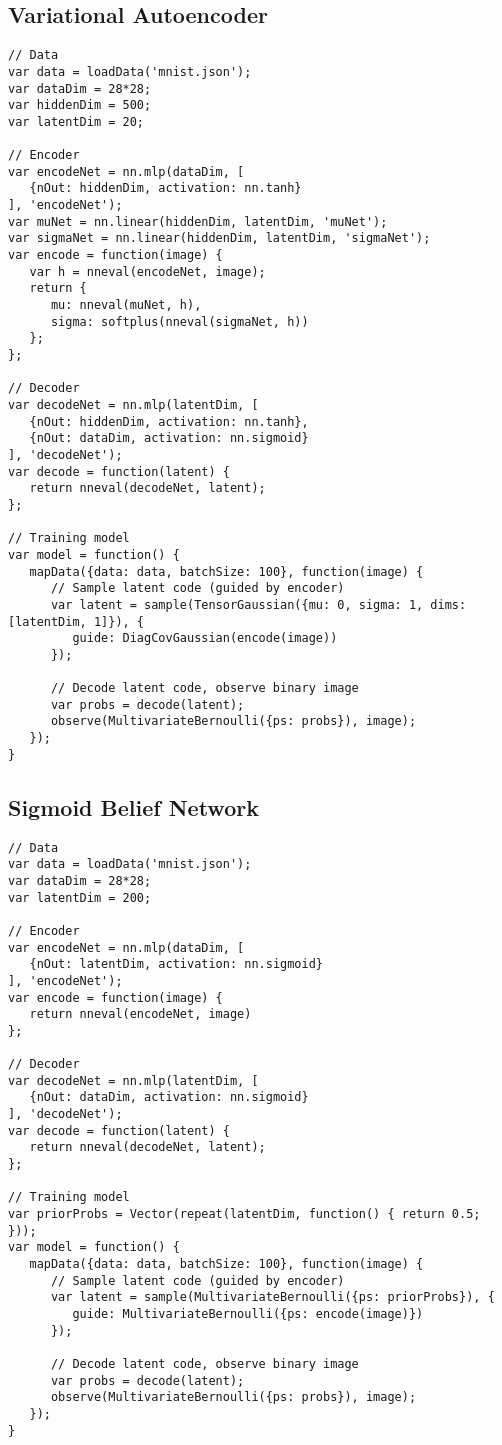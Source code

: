 \subsection{Variational Autoencoder}
\label{sec:appendix_code:vae}

\begin{lstlisting}
// Data
var data = loadData('mnist.json');
var dataDim = 28*28;
var hiddenDim = 500;
var latentDim = 20;

// Encoder
var encodeNet = nn.mlp(dataDim, [
   {nOut: hiddenDim, activation: nn.tanh}
], 'encodeNet');
var muNet = nn.linear(hiddenDim, latentDim, 'muNet');
var sigmaNet = nn.linear(hiddenDim, latentDim, 'sigmaNet');
var encode = function(image) {
   var h = nneval(encodeNet, image);
   return {
      mu: nneval(muNet, h),
      sigma: softplus(nneval(sigmaNet, h))
   };
};

// Decoder
var decodeNet = nn.mlp(latentDim, [
   {nOut: hiddenDim, activation: nn.tanh},
   {nOut: dataDim, activation: nn.sigmoid}
], 'decodeNet');
var decode = function(latent) {
   return nneval(decodeNet, latent);
};

// Training model
var model = function() {
   mapData({data: data, batchSize: 100}, function(image) {
      // Sample latent code (guided by encoder)
      var latent = sample(TensorGaussian({mu: 0, sigma: 1, dims: [latentDim, 1]}), {
         guide: DiagCovGaussian(encode(image))
      });

      // Decode latent code, observe binary image
      var probs = decode(latent);
      observe(MultivariateBernoulli({ps: probs}), image);
   });
}
\end{lstlisting}

\subsection{Sigmoid Belief Network}
\label{sec:appendix_code:sbn}

\begin{lstlisting}
// Data
var data = loadData('mnist.json');
var dataDim = 28*28;
var latentDim = 200;

// Encoder
var encodeNet = nn.mlp(dataDim, [
   {nOut: latentDim, activation: nn.sigmoid}
], 'encodeNet');
var encode = function(image) {
   return nneval(encodeNet, image)
};

// Decoder
var decodeNet = nn.mlp(latentDim, [
   {nOut: dataDim, activation: nn.sigmoid}
], 'decodeNet');
var decode = function(latent) {
   return nneval(decodeNet, latent);
};

// Training model
var priorProbs = Vector(repeat(latentDim, function() { return 0.5; }));
var model = function() {
   mapData({data: data, batchSize: 100}, function(image) {
      // Sample latent code (guided by encoder)
      var latent = sample(MultivariateBernoulli({ps: priorProbs}), {
         guide: MultivariateBernoulli({ps: encode(image)})
      });

      // Decode latent code, observe binary image
      var probs = decode(latent);
      observe(MultivariateBernoulli({ps: probs}), image);
   });
}
\end{lstlisting}


